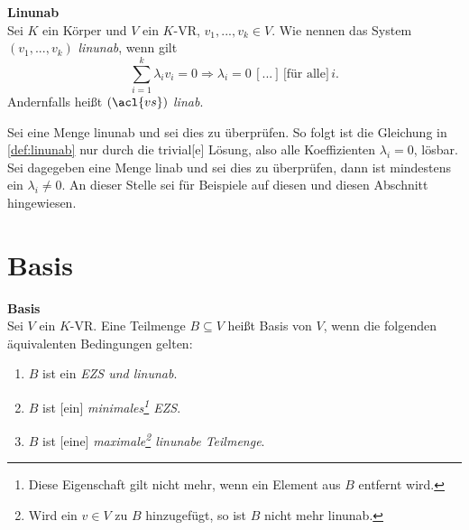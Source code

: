 
\theoremstyle{definition}
\begin{definition}{\textbf{\acl{Linunab}}}
\label{def:linunab}
	\\ \glqq Sei $K$ ein Körper und $V$ ein $K$-\acl{VR}, $v_1, ..., v_k \in V$. Wie nennen das System $(v_1, ..., v_k)$ \emph{\acl{linunab}}, wenn gilt
	\[\sum \limits_{i=1}^{k} \lambda_i v_i = 0 \Longrightarrow \lambda_i = 0 \,[...]\, \text{[für alle]}\, i \text{.}\]
	Andernfalls heißt \((\acl{vs})\) \emph{\acl{linab}}.{\grqq} \cite[S. 298, 16.5]{Tut} 
\end{definition}

Sei eine Menge \acl{linunab} und sei dies zu überprüfen. So folgt ist die Gleichung in \ref{def:linunab} nur durch die {\glqq}trivial[e]{\grqq} \cite[S. 307, 16.5]{Tut} Lösung, also alle Koeffizienten $\lambda_i = 0$, lösbar.
Sei dagegeben eine Menge \acl{linab} und sei dies zu überprüfen, dann ist mindestens ein $\lambda_i\not= 0$.
An dieser Stelle sei für Beispiele auf diesen und diesen Abschnitt hingewiesen.


\section{Basis}
\label{sec:Basis}

\theoremstyle{theo} \label{theo:Basis}
\begin{theo}{\textbf{Basis}}
\\ \glqq Sei $V$ ein $K$-\acl{VR}. Eine Teilmenge $B \subseteq V$ heißt Basis von $V$, wenn die folgenden äquivalenten Bedingungen gelten:
		\begin{enumerate}
		\item \label{Basis1} $B$ ist ein \emph{\acl{EZS} \emph{und} \acl{linunab}}.
		\item \label{Basis2}$B$ ist [ein] \emph{minimales\footnote{Diese Eigenschaft gilt nicht mehr, wenn ein Element aus $B$ entfernt wird.} \acl{EZS}}.
		\item \label{Basis3}$B$ ist [eine] \emph{maximale\footnote{Wird ein $v \in V$ zu $B$ hinzugefügt, so ist $B$ nicht mehr \acl{linunab}.} \acl{linunab}e Teilmenge}.{\grqq} \cite[S. 41, 9.16]{Skript}
		\end{enumerate}
\end{theo}

